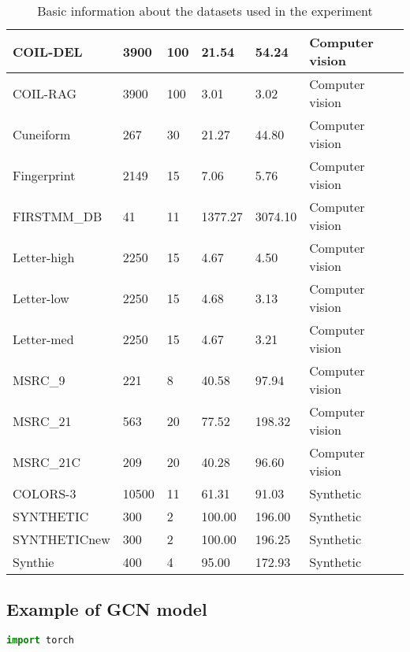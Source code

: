 \documentclass{article}
\begin{document}
\begin{table}[!ht]
\begin{tabular}{|l|l|l|l|l|l|}
        COIL-DEL & 3900 & 100 & 21.54 & 54.24 & Computer vision \\ \hline
        COIL-RAG & 3900 & 100 & 3.01 & 3.02 & Computer vision \\ \hline
        Cuneiform & 267 & 30 & 21.27 & 44.80 & Computer vision \\ \hline
        Fingerprint & 2149 & 15 & 7.06 & 5.76 & Computer vision \\ \hline
        FIRSTMM\_DB & 41 & 11 & 1377.27 & 3074.10 & Computer vision \\ \hline
        Letter-high & 2250 & 15 & 4.67 & 4.50 & Computer vision \\ \hline
        Letter-low & 2250 & 15 & 4.68 & 3.13 & Computer vision \\ \hline
        Letter-med & 2250 & 15 & 4.67 & 3.21 & Computer vision \\ \hline
        MSRC\_9 & 221 & 8 & 40.58 & 97.94 & Computer vision \\ \hline
        MSRC\_21 & 563 & 20 & 77.52 & 198.32 & Computer vision \\ \hline
        MSRC\_21C & 209 & 20 & 40.28 & 96.60 & Computer vision \\ \hline
        COLORS-3 & 10500 & 11 & 61.31 & 91.03 & Synthetic \\ \hline
        SYNTHETIC & 300 & 2 & 100.00 & 196.00 & Synthetic \\ \hline
        SYNTHETICnew & 300 & 2 & 100.00 & 196.25 & Synthetic \\ \hline
        Synthie & 400 & 4 & 95.00 & 172.93 & Synthetic \\ \hline
    \end{tabular}
    \caption{Basic information about the datasets used in the experiment}
    \label{tab:datasets}
\end{table}


\subsection{Example of GCN model}


\begin{lstlisting}[language=Python]
import torch


\end{lstlisting}
\end{document}
